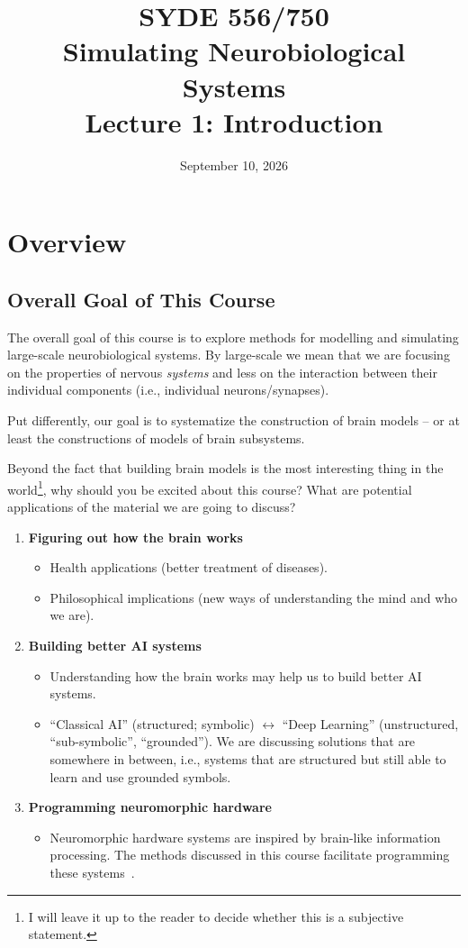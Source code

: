 \documentclass[10pt,letterpaper,oneside]{article}
\date{September 10, 2026}
\title{SYDE 556/750 \\ Simulating Neurobiological Systems \\ Lecture 1: Introduction}
\begin{document}

\section{Overview}


\subsection{Overall Goal of This Course}

The overall goal of this course is to explore methods for modelling and simulating large-scale neurobiological systems. By large-scale we mean that we are focusing on the properties of nervous \emph{systems} and less on the interaction between their individual components (i.e., individual neurons/synapses).

Put differently, our goal is to systematize the construction of brain models -- or at least the constructions of models of brain subsystems.

Beyond the fact that building brain models is the most interesting thing in the world\footnote{I will leave it up to the reader to decide whether this is a subjective statement.}, why should you be excited about this course? What are potential applications of the material we are going to discuss?
\begin{enumerate}[1.]
	\item \textbf{Figuring out how the brain works}
	\begin{itemize}
		\item Health applications (better treatment of diseases).
		\item Philosophical implications (new ways of understanding the mind and who we are).
	\end{itemize}
	\item \textbf{Building better AI systems}
	\begin{itemize}
		\item Understanding how the brain works may help us to build better AI systems.
		\item \enquote{Classical AI} (structured; symbolic) $\leftrightarrow$ \enquote{Deep Learning} (unstructured, \enquote{sub-symbolic}, \enquote{grounded}). We are discussing solutions that are somewhere in between, i.e., systems that are structured but still able to learn and use grounded symbols.
	\end{itemize}
	\item \textbf{Programming neuromorphic hardware}
	\begin{itemize}
		\item Neuromorphic hardware systems are inspired by brain-like information processing. The methods discussed in this course facilitate programming these systems~\cite{boahen2017neuromorph}.
	\end{itemize}
\end{enumerate}
\end{document}
